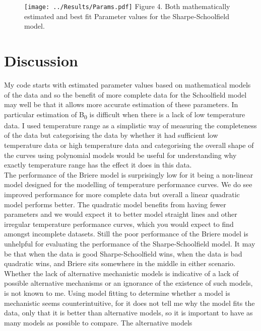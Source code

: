 \documentclass[12pt]{article}
\begin{document}
  \begin{figure}[]
    \texttt{[image: ../Results/Params.pdf]}
    Figure 4. Both mathematically estimated and best fit Parameter values for the Sharpe-Schoolfield model.
  \end{figure}

  \section{Discussion}

  My code starts with estimated parameter values based on mathematical models of the data and 
  so the benefit of more complete data for the Schoolfield model may well be that it allows more 
  accurate estimation of these parameters. In particular estimation of B\textsubscript{0} is 
  difficult when there is a lack of low temperature data. I used temperature range as a simplistic way of measuring
  the completeness of the data but categorising the data by whether it had sufficient low temperature data or high temperature data 
  and categorising the overall shape of the curves using polynomial models would be useful for understanding why exactly temperature 
  range has the effect it does in this data.\\
  The performance of the Briere model is surprisingly low for it being a non-linear model designed
  for the modelling of temperature performance curves. We do see improved performance for more complete data but overall 
  a linear quadratic model performs better. The quadratic model benefits from having fewer parameters and 
  we would expect it to better model straight lines and other irregular temperature performance curves, 
  which you would expect to find amongst incomplete datasets. Still the poor performance of the Briere model is unhelpful for evaluating the performance of the 
  Sharpe-Schoolfield model. It may be that when the data is good Sharpe-Schoolfield wins, when the data is bad quadratic wins, 
  and Briere sits somewhere in the middle in either scenario.\\
  Whether the lack of alternative mechanistic models is indicative of a lack of possible alternative mechanisms 
  or an ignorance of the existence of such models, is not known to me. Using model fitting to determine whether a 
  model is mechanistic seems counterintuitive, for it does not tell me why the model fits the data, only that 
  it is better than alternative models, so it is important to have as many models as possible to compare. The alternative models 
\end{document}
